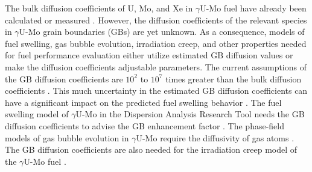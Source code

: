\documentclass{elsarticle}
\providecommand{\DIFadd}[1]{{\protect\color{blue} \sf #1}} %
\providecommand{\DIFdel}[1]{}
\providecommand{\DIFaddbegin}{} %
\providecommand{\DIFaddend}{} %
\providecommand{\DIFdelbegin}{} %
\providecommand{\DIFdelend}{} %
\begin{document}
\DIFdelbegin \DIFdel{Bulk diffusion properties }\DIFdelend \DIFaddbegin \DIFadd{The bulk diffusion coefficients }\DIFaddend of U, Mo, and Xe in $\gamma$U-Mo fuel have already been calculated \cite{smirnova2015, park2021} or measured \cite{huang2013}. However, the diffusion coefficients of \DIFaddbegin \DIFadd{the }\DIFaddend relevant species in $\gamma$U-Mo grain boundaries (GBs) are yet unknown. As a consequence, models of \DIFdelbegin \DIFdel{fission gas }\DIFdelend \DIFaddbegin \DIFadd{fuel }\DIFaddend swelling, gas bubble evolution, irradiation creep, and other \DIFdelbegin \DIFdel{fuel performance properties use }\DIFdelend \DIFaddbegin \DIFadd{properties needed for fuel performance evaluation either utilize }\DIFaddend estimated GB diffusion values or make the diffusion coefficients adjustable parameters. The current assumptions of \DIFaddbegin \DIFadd{the }\DIFaddend GB diffusion coefficients are \DIFdelbegin \DIFdel{10$^2$ to 10$^7$ }\DIFdelend \DIFaddbegin \DIFadd{$10^2$ to $10^7$ }\DIFaddend times greater than \DIFdelbegin \DIFdel{that of bulk diffusion }\DIFdelend \DIFaddbegin \DIFadd{the bulk diffusion coefficients }\DIFaddend \cite{annualreport2021, ye2015}. This much uncertainty in the estimated GB diffusion \DIFdelbegin \DIFdel{can produce significant impacts }\DIFdelend \DIFaddbegin \DIFadd{coefficients can have a significant impact }\DIFaddend on the predicted \DIFdelbegin \DIFdel{fission gas }\DIFdelend \DIFaddbegin \DIFadd{fuel }\DIFaddend swelling behavior \cite{annualreport2022}. The \DIFdelbegin \DIFdel{mechanistic gaseous }\DIFdelend \DIFaddbegin \DIFadd{fuel }\DIFaddend swelling model of $\gamma$U-Mo in \DIFdelbegin \DIFdel{DART }\DIFdelend \DIFaddbegin \DIFadd{the Dispersion Analysis Research Tool }\DIFaddend \cite{dart} needs the GB diffusion \DIFdelbegin \DIFdel{information }\DIFdelend \DIFaddbegin \DIFadd{coefficients }\DIFaddend to advise the GB enhancement factor \cite{cui2015, annualreport2021}. \DIFdelbegin \DIFdel{Phase-field }\DIFdelend \DIFaddbegin \DIFadd{The phase-field }\DIFaddend models of gas bubble evolution \DIFdelbegin \DIFdel{also }\DIFdelend \DIFaddbegin \DIFadd{in $\gamma$U-Mo }\DIFaddend require the diffusivity of gas atoms \cite{hu2021, annualreport2021}. \DIFdelbegin \DIFdel{Finally, }\DIFdelend \DIFaddbegin \DIFadd{The }\DIFaddend GB diffusion coefficients \DIFdelbegin \DIFdel{in $\gamma$U-Mo are }\DIFdelend \DIFaddbegin \DIFadd{are also }\DIFaddend needed for the irradiation creep model of the $\gamma$U-Mo fuel \cite{annualreport2022}.
\end{document}
